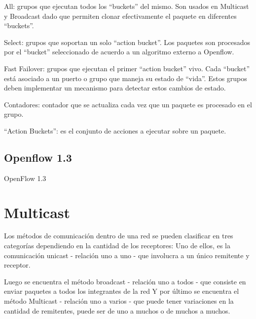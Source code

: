 \documentclass[12pt,a4paper,oneside]{book}
\begin{document}
\vspace{0.5cm}

All: grupos que ejecutan todos los “buckets” del mismo. Son usados en Multicast y Broadcast dado que permiten clonar efectivamente el paquete en diferentes “buckets”.

\vspace{0.5cm}

Select: grupos que soportan un solo “action bucket”. Los paquetes son procesados por el “bucket” seleccionado de acuerdo a un algoritmo externo a Openflow.

\vspace{0.5cm}

Fast Failover: grupos que ejecutan el primer “action bucket” vivo. Cada “bucket” está asociado a un puerto o grupo que maneja su estado de “vida”. Estos grupos deben implementar un mecanismo para detectar estos cambios de estado.

\vspace{0.5cm}

Contadores: contador que se actualiza cada vez que un paquete es procesado en el grupo.

\vspace{0.5cm}

“Action Buckets”: es el conjunto de acciones a ejecutar sobre un paquete.

\subsection{Openflow 1.3}
\label{openflow13}

OpenFlow 1.3

\section{Multicast}
\label{marco_multicast}

Los métodos de comunicación dentro de una red se pueden clasificar en tres categorías dependiendo en la cantidad de los receptores:
Uno de ellos, es  la comunicación unicast - relación uno a uno - que involucra a un único remitente y receptor. 

\vspace{0.5cm}

Luego se encuentra el método broadcast - relación uno a todos - que consiste en enviar paquetes a todos los integrantes de la red 
Y por último se encuentra el  método Multicast - relación uno a varios - que puede tener variaciones en la cantidad de remitentes, puede ser de uno a muchos o de muchos a muchos.
\end{document}
